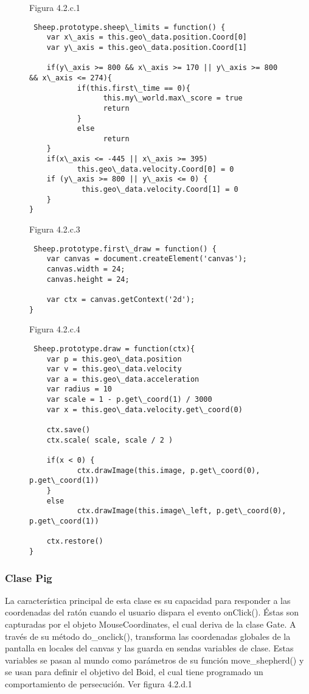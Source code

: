 \begin{figure}
Figura 4.2.c.1

\begin{verbatim}
 Sheep.prototype.sheep\_limits = function() {
    var x\_axis = this.geo\_data.position.Coord[0]
    var y\_axis = this.geo\_data.position.Coord[1]

    if(y\_axis >= 800 && x\_axis >= 170 || y\_axis >= 800 && x\_axis <= 274){
           if(this.first\_time == 0){
                 this.my\_world.max\_score = true
                 return
           }
           else
                 return
    }
    if(x\_axis <= -445 || x\_axis >= 395)
           this.geo\_data.velocity.Coord[0] = 0
    if (y\_axis >= 800 || y\_axis <= 0) {
            this.geo\_data.velocity.Coord[1] = 0
    }
}
\end{verbatim}


Figura 4.2.c.3
\begin{verbatim}
 Sheep.prototype.first\_draw = function() {
    var canvas = document.createElement('canvas');
    canvas.width = 24;
    canvas.height = 24;

    var ctx = canvas.getContext('2d');
}
\end{verbatim}


Figura 4.2.c.4
\begin{verbatim}
 Sheep.prototype.draw = function(ctx){
    var p = this.geo\_data.position
    var v = this.geo\_data.velocity
    var a = this.geo\_data.acceleration
    var radius = 10
    var scale = 1 - p.get\_coord(1) / 3000
    var x = this.geo\_data.velocity.get\_coord(0)

    ctx.save()
    ctx.scale( scale, scale / 2 )

    if(x < 0) {
           ctx.drawImage(this.image, p.get\_coord(0), p.get\_coord(1))
    }
    else
           ctx.drawImage(this.image\_left, p.get\_coord(0), p.get\_coord(1))

    ctx.restore()
}
\end{verbatim}
\end{figure}


\subsubsection{Clase Pig}
\label{subsubsection:pig}

La característica principal de esta clase es su capacidad para responder a las coordenadas del ratón cuando el usuario dispara el evento 
onClick(). Éstas son capturadas por el objeto MouseCoordinates, el cual deriva de la clase Gate. A través de su método do\_onclick(), 
transforma las coordenadas globales de la pantalla en locales del canvas y las guarda en sendas variables de clase. Estas variables se 
pasan al mundo como parámetros de su función move\_shepherd() y se usan para definir el objetivo del Boid, el cual tiene programado un 
comportamiento de persecución. Ver figura 4.2.d.1\\

